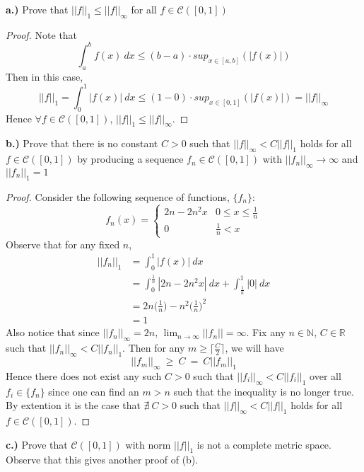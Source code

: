 \documentclass[12pt, letterpaper]{article}
\begin{document}
\noindent\textbf{a.)} Prove that $||f||_1 \leq ||f||_\infty$ for all $f\in \mathcal{C}([0,1])$
\begin{proof}
  Note that
  $$\int_a^b f(x) \ dx \leq (b - a) \cdot sup_{x\in[a,b]}(|f(x)|)$$
  Then in this case,
  $$||f||_1 = \int_0^1|f(x)| \ dx \leq (1 - 0) \cdot sup_{x\in[0,1]}(|f(x)|) = ||f||_\infty$$
  Hence $\forall f \in \mathcal{C}([0,1])$, $||f||_1 \leq ||f||_\infty$.
\end{proof}
\noindent\textbf{b.)} Prove that there is no constant $C>0$ such that $||f||_\infty < C||f||_1$ holds for all $f\in \mathcal{C}([0,1])$ by producing a sequence $f_n\in\mathcal{C}([0,1])$ with $||f_n||_\infty \to \infty$ and $||f_n||_1 = 1$
\begin{proof}
  Consider the following sequence of functions, $\{f_n\}$:
  \[
  f_n(x) =
  \begin{cases}
      2n - 2n^2x & 0 \leq x \leq \frac{1}{n} \\
      0 & \frac{1}{n} < x
   \end{cases}
  \]
  Observe that for any fixed $n$,
  \begin{align*}
    ||f_n||_1 &= \int_0^1|f(x)| \ dx \\
    &= \int_0^{\frac{1}{n}}|2n - 2n^2x| \ dx + \int_{\frac{1}{n}}^1 |0| \ dx \\
    &= 2n\bigg(\frac{1}{n}\bigg) - n^2\bigg(\frac{1}{n}\bigg)^2\\
    &= 1
  \end{align*}
  Also notice that since $||f_n||_\infty = 2n$, $\lim_{n\to\infty} ||f_n|| = \infty$. Fix any $n \in \mathbb{N}$, $C \in \mathbb{R}$ such that $||f_n||_\infty < C||f_n||_1$. Then for any $m \geq \big\lceil \frac{C}{2} \big\rceil$, we will have
  $$ ||f_m||_\infty \ \geq \ C \ = \ C||f_m||_1 $$
  Hence there does not exist any such $C>0$ such that $||f_i||_\infty < C||f_i||_1$ over all $f_i \in \{f_n\}$ since one can find an $m > n$ such that the inequality is no longer true. By extention it is the case that $\nexists \ C>0$ such that $||f||_\infty < C||f||_1$ holds for all $f\in \mathcal{C}([0,1])$.
\end{proof}
\noindent\textbf{c.)} Prove that $\mathcal{C}([0,1])$ with norm $||f||_1$ is not a complete metric space.  Observe that this gives another proof of (b).
\end{document}
